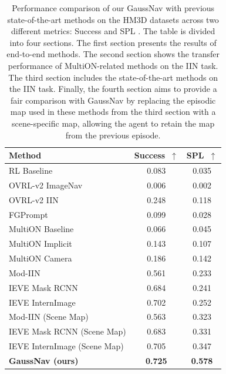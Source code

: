 
\begin{table}[tb]
  \centering
  \small
  \begin{tabular}{@{}l c c@{}}
    \toprule
    Method & Success~$\uparrow$ & SPL~$\uparrow$ \\
    \midrule
    RL Baseline \cite{krantz2022instancespecific} & 0.083 & 0.035  \\
    OVRL-v2 ImageNav \cite{yadav2023ovrl} & 0.006 & 0.002 \\
    OVRL-v2 IIN \cite{yadav2023ovrl} & 0.248 & 0.118 \\
    FGPrompt \cite{sun2024fgprompt} & 0.099 & 0.028 \\
    \midrule
    MultiON Baseline \cite{wani2020multion} & 0.066 & 0.045 \\
    MultiON Implicit \cite{marza2023multi} & 0.143 & 0.107 \\
    MultiON Camera \cite{chen2022learning} & 0.186 & 0.142 \\
    \midrule
    Mod-IIN \cite{krantz2023navigating} & 0.561 & 0.233 \\
    IEVE Mask RCNN \cite{lei2024instanceaware} & 0.684 & 0.241 \\
    IEVE InternImage \cite{lei2024instanceaware} & 0.702 & 0.252 \\
    \midrule
    Mod-IIN \cite{krantz2023navigating} (Scene Map) & 0.563 & 0.323 \\
    IEVE Mask RCNN \cite{lei2024instanceaware} (Scene Map) & 0.683 & 0.331 \\
    IEVE InternImage \cite{lei2024instanceaware} (Scene Map) & 0.705 & 0.347 \\
    \textbf{GaussNav (ours)} & \textbf{0.725} & \textbf{0.578}\\
    \bottomrule
  \end{tabular}
  \vspace{5pt}
  \caption{Performance comparison of our GaussNav with previous state-of-the-art methods on the HM3D \cite{yadav2023habitat} datasets across two different metrics: Success and SPL \cite{anderson2018evaluation}. The table is divided into four sections. The first section presents the results of end-to-end methods. The second section shows the transfer performance of MultiON-related methods on the IIN task. The third section includes the state-of-the-art methods on the IIN task. Finally, the fourth section aims to provide a fair comparison with GaussNav by replacing the episodic map used in these methods from the third section with a scene-specific map, allowing the agent to retain the map from the previous episode.}
  \vspace{-18pt}
  \label{tab:main}
\end{table}